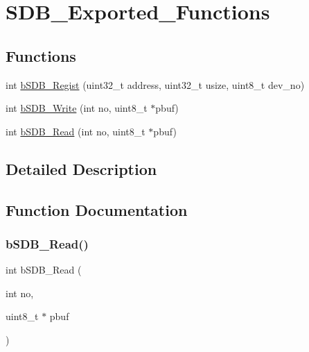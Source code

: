 \hypertarget{group___s_d_b___exported___functions}{}\section{S\+D\+B\+\_\+\+Exported\+\_\+\+Functions}
\label{group___s_d_b___exported___functions}
\subsection*{Functions}
\begin{DoxyCompactItemize}
\item 
int \mbox{\hyperlink{group___s_d_b___exported___functions_ga8474510e29441b9347a201ab0b0e3a36}{b\+S\+D\+B\+\_\+\+Regist}} (uint32\+\_\+t address, uint32\+\_\+t usize, uint8\+\_\+t dev\+\_\+no)
\item 
int \mbox{\hyperlink{group___s_d_b___exported___functions_gadb79970c59387bdfddf957fb64316711}{b\+S\+D\+B\+\_\+\+Write}} (int no, uint8\+\_\+t $\ast$pbuf)
\item 
int \mbox{\hyperlink{group___s_d_b___exported___functions_ga9dd3336fc4e954a363613c64b766943a}{b\+S\+D\+B\+\_\+\+Read}} (int no, uint8\+\_\+t $\ast$pbuf)
\end{DoxyCompactItemize}


\subsection{Detailed Description}


\subsection{Function Documentation}
\mbox{\label{group___s_d_b___exported___functions_ga9dd3336fc4e954a363613c64b766943a}} 
\subsubsection{\texorpdfstring{b\+S\+D\+B\+\_\+\+Read()}{bSDB\_Read()}}
{\footnotesize\ttfamily int b\+S\+D\+B\+\_\+\+Read (\begin{DoxyParamCaption}\item[{int}]{no,  }\item[{uint8\+\_\+t $\ast$}]{pbuf }\end{DoxyParamCaption})}

